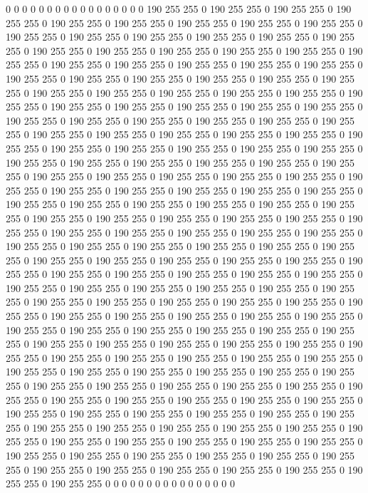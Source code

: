 0 0 0 0 0 0 0 0 0 0 0 0 0 0 0 0 0 190 255 255 0 190 255 255 0 190 255 255 0 190 255 255 0 190 255 255 0 190 255 255 0 190 255 255 0 190 255 255 0 190 255 255 0 190 255 255 0 190 255 255 0 190 255 255 0 190 255 255 0 190 255 255 0 190 255 255 0 190 255 255 0 190 255 255 0 190 255 255 0 190 255 255 0 190 255 255 0 190 255 255 0 190 255 255 0 190 255 255 0 190 255 255 0 190 255 255 0 190 255 255 0 190 255 255 0 190 255 255 0 190 255 255 0 190 255 255 0 190 255 255 0 190 255 255 0 190 255 255 0 190 255 255 0 190 255 255 0 190 255 255 0 190 255 255 0 190 255 255 0 190 255 255 0 190 255 255 0 190 255 255 0 190 255 255 0 190 255 255 0 190 255 255 0 190 255 255 0 190 255 255 
0 190 255 255 0 190 255 255 0 190 255 255 0 190 255 255 0 190 255 255 0 190 255 255 0 190 255 255 0 190 255 255 0 190 255 255 0 190 255 255 0 190 255 255 0 190 255 255 0 190 255 255 0 190 255 255 0 190 255 255 0 190 255 255 0 190 255 255 0 190 255 255 0 190 255 255 0 190 255 255 0 190 255 255 0 190 255 255 0 190 255 255 0 190 255 255 0 190 255 255 0 190 255 255 0 190 255 255 0 190 255 255 0 190 255 255 0 190 255 255 0 190 255 255 0 190 255 255 0 190 255 255 0 190 255 255 0 190 255 255 0 190 255 255 0 190 255 255 0 190 255 255 0 190 255 255 0 190 255 255 0 190 255 255 0 190 255 255 0 190 255 255 0 190 255 255 0 190 255 255 0 190 255 255 0 190 255 255 0 190 255 255 0 190 255 255 0 190 255 255 
0 190 255 255 0 190 255 255 0 190 255 255 0 190 255 255 0 190 255 255 0 190 255 255 0 190 255 255 0 190 255 255 0 190 255 255 0 190 255 255 0 190 255 255 0 190 255 255 0 190 255 255 0 190 255 255 0 190 255 255 0 190 255 255 0 190 255 255 0 190 255 255 0 190 255 255 0 190 255 255 0 190 255 255 0 190 255 255 0 190 255 255 0 190 255 255 0 190 255 255 0 190 255 255 0 190 255 255 0 190 255 255 0 190 255 255 0 190 255 255 0 190 255 255 0 190 255 255 0 190 255 255 0 190 255 255 0 190 255 255 0 190 255 255 0 190 255 255 0 190 255 255 0 190 255 255 0 190 255 255 0 190 255 255 0 190 255 255 0 190 255 255 0 190 255 255 0 190 255 255 0 190 255 255 0 190 255 255 0 190 255 255 0 190 255 255 0 190 255 255 
0 190 255 255 0 190 255 255 0 190 255 255 0 190 255 255 0 190 255 255 0 190 255 255 0 190 255 255 0 190 255 255 0 190 255 255 0 190 255 255 0 190 255 255 0 190 255 255 0 190 255 255 0 190 255 255 0 190 255 255 0 190 255 255 0 190 255 255 0 190 255 255 0 190 255 255 0 190 255 255 0 190 255 255 0 190 255 255 0 190 255 255 0 190 255 255 0 190 255 255 0 190 255 255 0 190 255 255 0 190 255 255 0 190 255 255 0 190 255 255 0 190 255 255 0 190 255 255 0 190 255 255 0 190 255 255 0 190 255 255 0 190 255 255 0 190 255 255 0 190 255 255 0 190 255 255 0 190 255 255 0 190 255 255 0 190 255 255 0 190 255 255 0 190 255 255 0 190 255 255 0 190 255 255 0 0 0 0 0 0 0 0 0 0 0 0 0 0 0 0 

